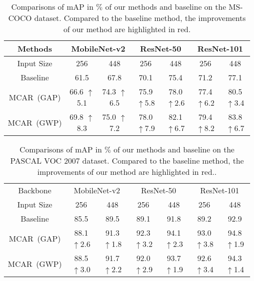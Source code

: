 \documentclass[journal]{IEEEtran}
\begin{document}
\begin{table*}[t]
	\centering
	\caption{Comparisons of mAP in $\%$ of our methods and baseline on the MS-COCO dataset. Compared to the baseline method, the improvements of our method are highlighted in red.}\label{table:coco-as}
	\footnotesize{
	\begin{tabular}{|c||c|c||c|c||c|c|}
	\hline
	Methods  &\multicolumn{2}{c||}{MobileNet-v2} &\multicolumn{2}{c||}{ResNet-50} &\multicolumn{2}{c|}{ResNet-101}\\  
	\hline
         Input Size                &256  &448   &256  &448   &256  &448 \\     
	\hline\hline
	Baseline                  &61.5 &67.8  &70.1 &75.4  &71.2 &77.1  \\
	\hline
	MCAR~(GAP)        &66.6  {\color{red} $\uparrow$5.1} &74.3  {\color{red} $\uparrow$6.5}  &75.9  {\color{red} $\uparrow$5.8} &78.0 {\color{red} $\uparrow$2.6}  &77.4  {\color{red} $\uparrow$6.2}  &80.5  {\color{red} $\uparrow$3.4}  \\
	MCAR~(GWP)       &69.8  {\color{red} $\uparrow$8.3} &75.0 {\color{red} $\uparrow$7.2}   &78.0  {\color{red} $\uparrow$7.9} &82.1 {\color{red} $\uparrow$6.7}  &79.4  {\color{red} $\uparrow$8.2} &83.8   {\color{red} $\uparrow$6.7} \\
        \hline
       \end{tabular}}
       \end{table*}
\begin{table*}[t]
	\centering
	\caption{Comparisons of mAP in $\%$ of our methods and baseline on the PASCAL VOC 2007 dataset. Compared to the baseline method, the improvements of our method are highlighted in red..}\label{table:voc07-as}
	\footnotesize{
	\begin{tabular}{|c||c|c||c|c||c|c|}
	\hline
	Backbone  &\multicolumn{2}{c||}{MobileNet-v2} &\multicolumn{2}{c||}{ResNet-50} &\multicolumn{2}{c|}{ResNet-101}\\   
	\cline{1-7} 
	Input Size                &256 &448  &256 &448 &256 &448 \\              
	\hline\hline
	Baseline             &85.5           &89.5           &89.1          &91.8  &89.2 &92.9 \\
	\hline
	MCAR~(GAP)    &88.1 {\color{red} $\uparrow$2.6}   &91.3 {\color{red} $\uparrow$1.8} &92.3 {\color{red} $\uparrow$3.2}&94.1 {\color{red} $\uparrow$2.3} &93.0 {\color{red} $\uparrow$3.8} &94.8 {\color{red} $\uparrow$1.9}\\
	MCAR~(GWP)   &88.5 {\color{red} $\uparrow$3.0}   &91.7 {\color{red} $\uparrow$2.2} &92.0 {\color{red} $\uparrow$2.9}&93.7 {\color{red} $\uparrow$1.9} &92.6 {\color{red} $\uparrow$3.4} &94.3 {\color{red} $\uparrow$1.4}\\
        \hline
       \end{tabular}}
\end{table*}
\end{document}
